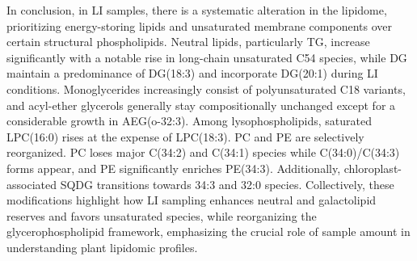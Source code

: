 \documentclass[10pt,letterpaper]{article}
\begin{document}
In conclusion, in LI samples, there is a systematic alteration in the lipidome, prioritizing energy-storing lipids and unsaturated membrane components over certain structural phospholipids. Neutral lipids, particularly TG, increase significantly with a notable rise in long-chain unsaturated C54 species, while DG maintain a predominance of DG(18:3) and incorporate DG(20:1) during LI conditions. Monoglycerides increasingly consist of polyunsaturated C18 variants, and acyl-ether glycerols generally stay compositionally unchanged except for a considerable growth in AEG(o-32:3). Among lysophospholipids, saturated LPC(16:0) rises at the expense of LPC(18:3). PC and PE are selectively reorganized. PC loses major C(34:2) and C(34:1) species while C(34:0)/C(34:3) forms appear, and PE significantly enriches PE(34:3). Additionally, chloroplast-associated SQDG transitions towards 34:3 and 32:0 species. Collectively, these modifications highlight how LI sampling enhances neutral and galactolipid reserves and favors unsaturated species, while reorganizing the glycerophospholipid framework, emphasizing the crucial role of sample amount in understanding plant lipidomic profiles.
\end{document}
